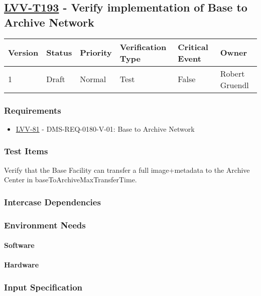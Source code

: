 \subsection{\href{https://jira.lsstcorp.org/secure/Tests.jspa\#/testCase/LVV-T193}{LVV-T193}
    - Verify implementation of Base to Archive Network}\label{lvv-t193}

\begin{longtable}[]{llllll}
\toprule
Version & Status & Priority & Verification Type & Critical Event & Owner
\\\midrule
1 & Draft & Normal &
Test & False & Robert Gruendl
\\\bottomrule
\end{longtable}

\subsubsection{Requirements}
\begin{itemize}
\item \href{https://jira.lsstcorp.org/browse/LVV-81}{LVV-81} - DMS-REQ-0180-V-01: Base to Archive Network
\end{itemize}

\subsubsection{Test Items}
Verify that the Base Facility can transfer a full image+metadata to the
Archive Center in baseToArchiveMaxTransferTime.



\subsubsection{Intercase Dependencies}

\subsubsection{Environment Needs}

\paragraph{Software}

\paragraph{Hardware}

\subsubsection{Input Specification}

